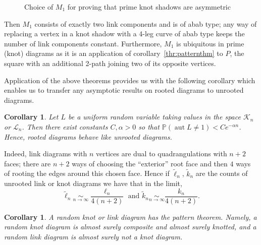 \documentclass[amsmath,longbibliography,secnumarabic,floatfix,amssymb,nofootinbib,nobibnotes,letterpaper,11pt,tightenlines,notitlepage,showkeys,showlabels]{amsart}%
\newcommand{\KnotDia}{\mathcal{K}}
\newcommand{\LinkDia}{\mathcal{L}}
\newcommand{\Prb}{\mathbb{P}}
\DeclareMathOperator{\Aut}{aut}
\newtheorem{corollary}[theorem]{Corollary}
\theoremstyle{definition}
\begin{document}
\begin{figure}[h!]
  \caption{Choice of $M_1$ for proving that prime knot shadows
    are asymmetric}
  \label{fig:primeknotasymm}
\end{figure}
Then $M_1$ consists of exactly two link components and is of abab
type; any way of replacing a vertex in a knot shadow with a 4-leg
curve of abab type keeps the number of link components
constant. Furthermore, $M_1$ is ubiquitous in prime (knot) diagrams as
it is an application of corollary~\ref{thr:patternthm} to $P$, the
square with an additional 2-path joining two of its opposite vertices.

Application of the above theorems provides us with the following corollary which enables us to
transfer any asymptotic results on rooted diagrams to unrooted diagrams.

\begin{corollary}
  Let $L$ be a uniform random variable taking values in the space $\KnotDia_n$ or $\LinkDia_n$. Then
  there exist constants $C, \alpha > 0$ so that $\Prb(\Aut L \ne 1) < Ce^{-\alpha n}$. Hence, rooted
  diagrams behave like unrooted diagrams.
\end{corollary}

Indeed, link diagrams with $n$ vertices are dual to quadrangulations with $n+2$ faces; there are
$n+2$ ways of choosing the ``exterior'' root face and then $4$ ways of rooting the edges around this
chosen face. Hence if $\tilde \ell_n$, $\tilde k_n$ are the counts of unrooted link or knot diagrams
we have that in the limit,
\[ \tilde\ell_n \underset{n\to\infty}{\sim} \frac{\ell_n}{4(n+2)} \text{ and } \tilde k_n
\underset{n\to\infty}{\sim} \frac{k_n}{4(n+2)}.\]

\begin{corollary}
  A random knot or link diagram has the pattern theorem. Namely, a random knot diagram is almost
  surely composite and almost surely knotted, and a random link diagram is almost surely not a knot
  diagram.
\end{corollary}
\end{document}
